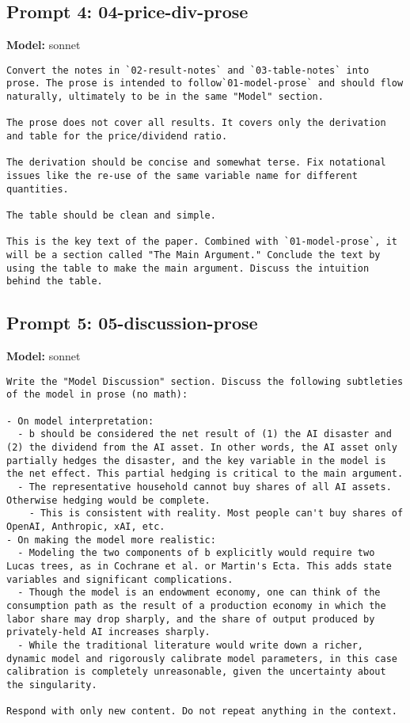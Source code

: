 \subsection*{Prompt 4: 04-price-div-prose}
\textbf{Model:} sonnet
\vspace{0.5em}
\begin{lstlisting}[language=text,breaklines=true,frame=single]
Convert the notes in `02-result-notes` and `03-table-notes` into prose. The prose is intended to follow`01-model-prose` and should flow naturally, ultimately to be in the same "Model" section.

The prose does not cover all results. It covers only the derivation and table for the price/dividend ratio.

The derivation should be concise and somewhat terse. Fix notational issues like the re-use of the same variable name for different quantities.

The table should be clean and simple. 

This is the key text of the paper. Combined with `01-model-prose`, it will be a section called "The Main Argument." Conclude the text by using the table to make the main argument. Discuss the intuition behind the table.

\end{lstlisting}
\vspace{1em}
\subsection*{Prompt 5: 05-discussion-prose}
\textbf{Model:} sonnet
\vspace{0.5em}
\begin{lstlisting}[language=text,breaklines=true,frame=single]
Write the "Model Discussion" section. Discuss the following subtleties of the model in prose (no math):

- On model interpretation:      
  - b should be considered the net result of (1) the AI disaster and (2) the dividend from the AI asset. In other words, the AI asset only partially hedges the disaster, and the key variable in the model is the net effect. This partial hedging is critical to the main argument.
  - The representative household cannot buy shares of all AI assets. Otherwise hedging would be complete.
    - This is consistent with reality. Most people can't buy shares of OpenAI, Anthropic, xAI, etc.
- On making the model more realistic:
  - Modeling the two components of b explicitly would require two Lucas trees, as in Cochrane et al. or Martin's Ecta. This adds state variables and significant complications.
  - Though the model is an endowment economy, one can think of the consumption path as the result of a production economy in which the labor share may drop sharply, and the share of output produced by privately-held AI increases sharply.
  - While the traditional literature would write down a richer, dynamic model and rigorously calibrate model parameters, in this case calibration is completely unreasonable, given the uncertainty about the singularity.    

Respond with only new content. Do not repeat anything in the context.    

\end{lstlisting}
\vspace{1em}
